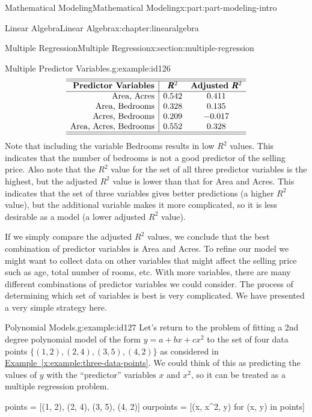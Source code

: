 \documentclass[oneside,10pt,]{book}
\newcommand{\xreffont}{\relax}
\numberwithin{equation}{section}
\begin{document}
\begin{partptx}{Mathematical Modeling}{}{Mathematical Modeling}{}{}{x:part:part-modeling-intro}
\begin{chapterptx}{Linear Algebra}{}{Linear Algebra}{}{}{x:chapter:linearalgebra}
\begin{sectionptx}{Multiple Regression}{}{Multiple Regression}{}{}{x:section:multiple-regression}
\begin{example}{Multiple Predictor Variables.}{g:example:id126}
\begin{equation*}
\begin{array}{r|cc}\hline\hline
\textbf{Predictor Variables} & \pmb{R}^2 & \textbf{Adjusted $\pmb{R}^2$} \\\hline
\textrm{Area, Acres} & 0.542 & 0.411 \\
\textrm{Area, Bedrooms} & 0.328 & 0.135\\
\textrm{Acres, Bedrooms} & 0.209 & -0.017 \\
\textrm{Area, Acres, Bedrooms} & 0.552 & 0.328 \\\hline\hline
\end{array}
\end{equation*}
Note that including the variable Bedrooms results in low \(R^2\) values. This indicates that the number of bedrooms is not a good predictor of the selling price. Also note that the \(R^2\) value for the set of all three predictor variables is the highest, but the adjusted \(R^2\) value is lower than that for Area and Acres. This indicates that the set of three variables gives better predictions (a higher \(R^2\) value), but the additional variable makes it more complicated, so it is less desirable as a model (a lower adjusted \(R^2\) value).%
\par
If we simply compare the adjusted \(R^2\) values, we conclude that the best combination of predictor variables is Area and Acres. To refine our model we might want to collect data on other variables that might affect the selling price such as age, total number of rooms, etc. With more variables, there are many different combinations of predictor variables we could consider. The process of determining which set of variables is best is very complicated. We have presented a very simple strategy here.%
\end{example}
\begin{example}{Polynomial Models.}{g:example:id127}%
Let’s return to the problem of fitting a 2nd degree polynomial model of the form \(y = a + bx + cx^2\) to the set of four data points \(\{(1, 2) , (2, 4) , (3, 5) , (4, 2)\}\) as considered in \hyperref[x:example:three-data-points]{Example~{\xreffont\ref{x:example:three-data-points}}}. We could think of this as predicting the values of \(y\) with the ``predictor'' variables \(x\) and \(x^2\), so it can be treated as a multiple regression problem.%
\begin{sageinput}
points = [(1, 2), (2, 4), (3, 5), (4, 2)]
ourpoints = [(x, x^2, y) for (x, y) in points]


\end{sageinput}
\end{example}
\end{sectionptx}
\end{chapterptx}
\end{partptx}
\end{document}
